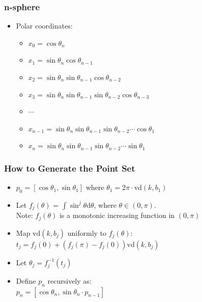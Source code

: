 \documentclass[serif]{beamer} %
\begin{document}
\begin{frame}
  \frametitle{n-sphere}
  \begin{itemize}
    \item Polar coordinates:
    \begin{itemize}
      \item $x_0 = \cos\theta_n$
      \item $x_1 = \sin\theta_n \cos\theta_{n-1}$
      \item $x_2 = \sin\theta_n \sin\theta_{n-1} \cos\theta_{n-2} $
      \item $x_3 = \sin\theta_n \sin\theta_{n-1} \sin\theta_{n-2} \cos\theta_{n-3} $
      \item $\cdots$
      \item $x_{n-1} = \sin\theta_n \sin\theta_{n-1} \sin\theta_{n-2} \cdots \cos\theta_1$
      \item $x_n = \sin\theta_n \sin\theta_{n-1} \sin\theta_{n-2} \cdots \sin\theta_1$
    \end{itemize}
  \end{itemize}
\end{frame}

\begin{frame}
  \frametitle{How to Generate the Point Set}
  \begin{itemize}
    \item $p_0 = [\cos\theta_1, \sin\theta_1]$ where $\theta_1 = 2\pi\cdot\mathrm{vd}(k,b_1)$
    \item Let $f_j(\theta)$ = $\int\sin^j\theta \mathrm{d}\theta$, where $\theta\in (0,\pi)$. \\
    Note: $f_j(\theta)$ is a monotonic increasing function in $(0,\pi) $
    \item Map $\mathrm{vd}(k,b_j)$ uniformly to $f_j(\theta)$:\\
     $t_j = f_j(0) + (f_j(\pi) - f_j(0)) \mathrm{vd}(k,b_j)$
    \item Let $\theta_j = f_j^{-1}(t_j)$
    \item Define $p_n$ recursively as: \\
          $p_n = [\cos\theta_n, \sin\theta_n \cdot p_{n-1}]$
  \end{itemize}
\end{frame}
\end{document}
